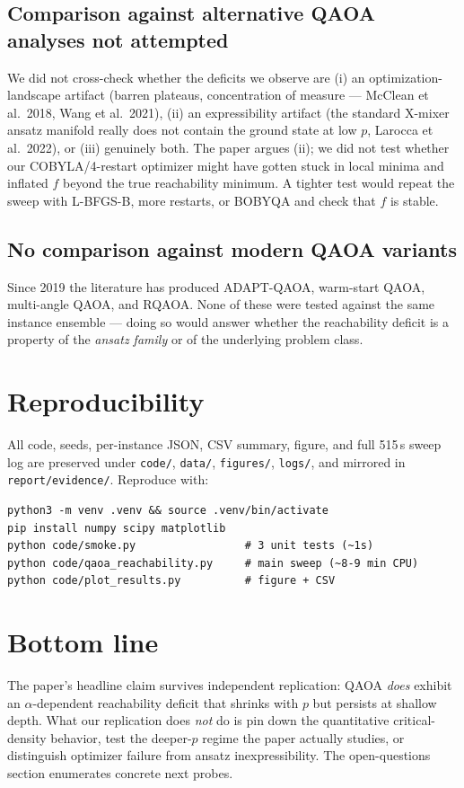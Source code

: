 \documentclass[11pt]{article}
\begin{document}
\subsection{Comparison against alternative QAOA analyses not attempted}
We did not cross-check whether the deficits we observe are (i) an
optimization-landscape artifact (barren plateaus, concentration of
measure --- McClean et al.\ 2018, Wang et al.\ 2021), (ii) an expressibility
artifact (the standard X-mixer ansatz manifold really does not
contain the ground state at low \(p\), Larocca et al.\ 2022), or
(iii) genuinely both. The paper argues (ii); we did not test whether
our COBYLA/4-restart optimizer might have gotten stuck in local
minima and inflated \(f\) beyond the true reachability minimum. A
tighter test would repeat the sweep with L-BFGS-B, more restarts, or
BOBYQA and check that \(f\) is stable.

\subsection{No comparison against modern QAOA variants}
Since 2019 the literature has produced ADAPT-QAOA, warm-start QAOA,
multi-angle QAOA, and RQAOA. None of these were tested against the
same instance ensemble --- doing so would answer whether the
reachability deficit is a property of the \emph{ansatz family} or of
the underlying problem class.

\section{Reproducibility}
All code, seeds, per-instance JSON, CSV summary, figure, and full
515\,s sweep log are preserved under
\texttt{code/}, \texttt{data/}, \texttt{figures/}, \texttt{logs/},
and mirrored in \texttt{report/evidence/}. Reproduce with:
\begin{verbatim}
python3 -m venv .venv && source .venv/bin/activate
pip install numpy scipy matplotlib
python code/smoke.py                 # 3 unit tests (~1s)
python code/qaoa_reachability.py     # main sweep (~8-9 min CPU)
python code/plot_results.py          # figure + CSV
\end{verbatim}

\section{Bottom line}
The paper's headline claim survives independent replication:
QAOA \emph{does} exhibit an \(\alpha\)-dependent reachability deficit
that shrinks with \(p\) but persists at shallow depth. What our
replication does \emph{not} do is pin down the quantitative
critical-density behavior, test the deeper-\(p\) regime the paper
actually studies, or distinguish optimizer failure from ansatz
inexpressibility. The open-questions section enumerates concrete
next probes.
\end{document}
